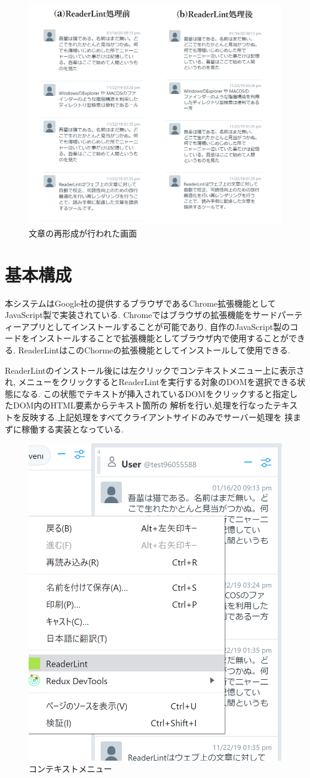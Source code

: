 \begin{figure}[H]
    \centering
    \label{fig:image11}
    \includegraphics[width=0.7\columnwidth]{image/03/img2.png}
    \caption[文章の再形成が行われた画面]{文章の再形成が行われた画面\footnotemark[1]}
\end{figure}


\section{基本構成}

本システムはGoogle社の提供するブラウザであるChrome拡張機能としてJavaScript製で実装されている.
Chromeではブラウザの拡張機能をサードパーティーアプリとしてインストールすることが可能であり,
自作のJavaScript製のコードをインストールすることで拡張機能としてブラウザ内で使用することができる.
ReaderLintはこのChormeの拡張機能としてインストールして使用できる.

ReaderLintのインストール後には左クリックでコンテキストメニュー上に表示され,
メニューをクリックするとReaderLintを実行する対象のDOMを選択できる状態になる.
この状態でテキストが挿入されているDOMをクリックすると指定したDOM内のHTML要素からテキスト箇所の
解析を行い,処理を行なったテキストを反映する.上記処理をすべてクライアントサイドのみでサーバー処理を
挟まずに稼働する実装となっている.

\begin{figure}[H]
    \centering
    \label{fig:context}
    \includegraphics[width=0.4\columnwidth]{image/03/img0.png}
    \caption[コンテキストメニュー]{コンテキストメニュー}
\end{figure}

